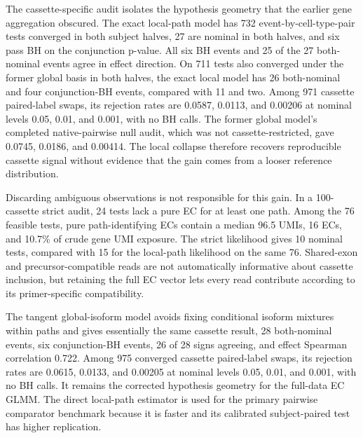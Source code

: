 \documentclass[11pt]{article}
\begin{document}
The cassette-specific audit isolates the hypothesis geometry that the earlier gene aggregation obscured. The exact local-path model has 732 event-by-cell-type-pair tests converged in both subject halves, 27 are nominal in both halves, and six pass BH on the conjunction p-value. All six BH events and 25 of the 27 both-nominal events agree in effect direction. On 711 tests also converged under the former global basis in both halves, the exact local model has 26 both-nominal and four conjunction-BH events, compared with 11 and two. Among 971 cassette paired-label swaps, its rejection rates are 0.0587, 0.0113, and 0.00206 at nominal levels 0.05, 0.01, and 0.001, with no BH calls. The former global model's completed native-pairwise null audit, which was not cassette-restricted, gave 0.0745, 0.0186, and 0.00414. The local collapse therefore recovers reproducible cassette signal without evidence that the gain comes from a looser reference distribution.

Discarding ambiguous observations is not responsible for this gain. In a 100-cassette strict audit, 24 tests lack a pure EC for at least one path. Among the 76 feasible tests, pure path-identifying ECs contain a median 96.5 UMIs, 16 ECs, and 10.7\% of crude gene UMI exposure. The strict likelihood gives 10 nominal tests, compared with 15 for the local-path likelihood on the same 76. Shared-exon and precursor-compatible reads are not automatically informative about cassette inclusion, but retaining the full EC vector lets every read contribute according to its primer-specific compatibility.

The tangent global-isoform model avoids fixing conditional isoform mixtures within paths and gives essentially the same cassette result, 28 both-nominal events, six conjunction-BH events, 26 of 28 signs agreeing, and effect Spearman correlation 0.722. Among 975 converged cassette paired-label swaps, its rejection rates are 0.0615, 0.0133, and 0.00205 at nominal levels 0.05, 0.01, and 0.001, with no BH calls. It remains the corrected hypothesis geometry for the full-data EC GLMM. The direct local-path estimator is used for the primary pairwise comparator benchmark because it is faster and its calibrated subject-paired test has higher replication.
\end{document}
